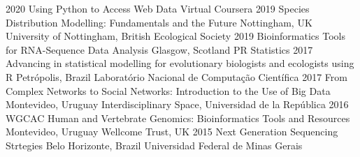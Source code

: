 \documentclass[9pt]{developercv} %
\begin{document}
\begin{entrylist}
	\entrylong
		{2020}
		{Using Python to Access Web Data}
		{Virtual}
		{Coursera}	
	\entrylong
		{2019}
		{Species Distribution Modelling: Fundamentals and the Future}
		{Nottingham, UK}
		{University of Nottingham, British Ecological Society}	
	\entrylong
		{2019}
		{Bioinformatics Tools for RNA-Sequence Data Analysis}
		{Glasgow, Scotland}
		{PR Statistics}	
	\entrylong
		{2017}
		{Advancing in statistical modelling for evolutionary biologists and ecologists using R}
		{Petrópolis, Brazil}
		{Laboratório Nacional de Computação Científica}
	\entrylong
		{2017}
		{From Complex Networks to Social Networks: Introduction to the Use of Big Data}
		{Montevideo, Uruguay}
		{Interdisciplinary Space, Universidad de la República}
	\entrylong
		{2016}
		{WGCAC Human and Vertebrate Genomics: Bioinformatics Tools and Resources}
		{Montevideo, Uruguay}
		{Wellcome Trust, UK}
	\entrylong
		{2015}
		{Next Generation Sequencing Strtegies}
		{Belo Horizonte, Brazil}
		{Universidad Federal de Minas Gerais}

\end{entrylist}


\end{document}
